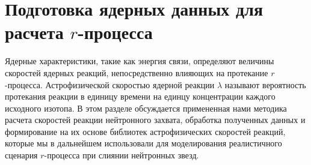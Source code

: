 \section{Подготовка ядерных данных для расчета $r$-процесса} 
Ядерные характеристики, такие как энергия связи, определяют величины скоростей ядерных реакций, непосредственно влияющих на протекание $r$-процесса. Астрофизической скоростью ядерной реакции $\lambda$ называют вероятность протекания реакции в единицу времени на единцу концентрации каждого исходного изотопа. В этом разделе обсуждается примененная нами методика расчета скоростей реакции нейтронного захвата, обработка полученных данных и формирование на их основе библиотек астрофизических скоростей реакций, которые мы в дальнейшем использовали для моделирования реалистичного сценария $r$-процесса при слиянии нейтронных звезд.
